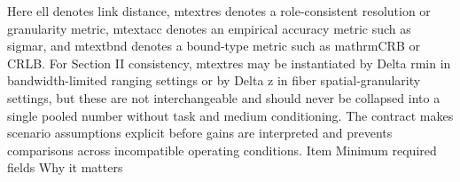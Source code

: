 {}\markdownRendererDollarSign{}\markdownRendererDollarSign{}\markdownRendererParagraphSeparator
{}Here \markdownRendererDollarSign{}\markdownRendererBackslash{}ell\markdownRendererDollarSign{} denotes link distance, \markdownRendererDollarSign{}m\markdownRendererUnderscore{}\markdownRendererLeftBrace{}\markdownRendererBackslash{}text\markdownRendererLeftBrace{}res\markdownRendererRightBrace{}\markdownRendererRightBrace{}\markdownRendererDollarSign{} denotes a role-consistent resolution or granularity metric, \markdownRendererDollarSign{}m\markdownRendererUnderscore{}\markdownRendererLeftBrace{}\markdownRendererBackslash{}text\markdownRendererLeftBrace{}acc\markdownRendererRightBrace{}\markdownRendererRightBrace{}\markdownRendererDollarSign{} denotes an empirical accuracy metric such as \markdownRendererDollarSign{}\markdownRendererBackslash{}sigma\markdownRendererUnderscore{}r\markdownRendererDollarSign{}, and \markdownRendererDollarSign{}m\markdownRendererUnderscore{}\markdownRendererLeftBrace{}\markdownRendererBackslash{}text\markdownRendererLeftBrace{}bnd\markdownRendererRightBrace{}\markdownRendererRightBrace{}\markdownRendererDollarSign{} denotes a bound-type metric such as \markdownRendererDollarSign{}\markdownRendererBackslash{}mathrm\markdownRendererLeftBrace{}CRB\markdownRendererRightBrace{}\markdownRendererDollarSign{} or CRLB. For Section II consistency, \markdownRendererDollarSign{}m\markdownRendererUnderscore{}\markdownRendererLeftBrace{}\markdownRendererBackslash{}text\markdownRendererLeftBrace{}res\markdownRendererRightBrace{}\markdownRendererRightBrace{}\markdownRendererDollarSign{} may be instantiated by \markdownRendererDollarSign{}\markdownRendererBackslash{}Delta r\markdownRendererUnderscore{}\markdownRendererLeftBrace{}\markdownRendererBackslash{}min\markdownRendererRightBrace{}\markdownRendererDollarSign{} in bandwidth-limited ranging settings or by \markdownRendererDollarSign{}\markdownRendererBackslash{}Delta z\markdownRendererDollarSign{} in fiber spatial-granularity settings, but these are not interchangeable and should never be collapsed into a single pooled number without task and medium conditioning. The contract makes scenario assumptions explicit before gains are interpreted and prevents comparisons across incompatible operating conditions.\markdownRendererParagraphSeparator
{}\markdownRendererParagraphSeparator
{}\markdownRendererPipe{} Item \markdownRendererPipe{} Minimum required fields \markdownRendererPipe{} Why it matters \markdownRendererPipe{}\markdownRendererSoftLineBreak
